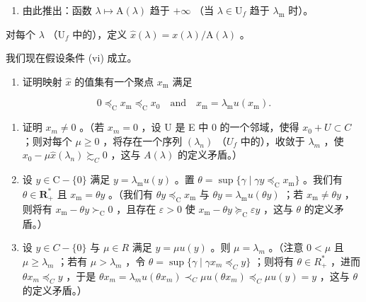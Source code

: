 \begin{enumerate}
\def\labelenumi{\alph{enumi})}
\setcounter{enumi}{1}
\tightlist
\item
  由此推出：函数 \(\lambda \mapsto \mathrm{A}(\lambda)\) 趋于 \(+\infty\) （当 \(\lambda \in \mathrm{U}_f\) 趋于 \(\lambda_{\mathrm{m}}\) 时）。
\end{enumerate}

对每个 \(\lambda\) （\(\mathrm{U}_f\) 中的），定义 \(\hat{x} (\lambda) = x(\lambda) / \mathrm{A}(\lambda)\) 。

我们现在假设条件 (vi) 成立。

\begin{enumerate}
\def\labelenumi{\alph{enumi})}
\setcounter{enumi}{2}
\tightlist
\item
  证明映射 \(\hat{x}\) 的值集有一个聚点 \(x_{\mathrm{m}}\) 满足
\end{enumerate}

\[
0 \preccurlyeq_ {\mathrm{C}} x _ {\mathrm{m}} \preccurlyeq_ {\mathrm{C}} x _ {0} \quad \text {and} \quad x _ {\mathrm{m}} = \lambda_ {\mathrm{m}} u (x _ {\mathrm{m}}).
\]

\begin{enumerate}
\def\labelenumi{\alph{enumi})}
\setcounter{enumi}{3}
\item
  证明 \(x_{m} \neq 0\) 。（若 \(x_{m} = 0\) ，设 U 是 E 中 0 的一个邻域，使得 \(x_{0} + U \subset C\) ；则对每个 \(\mu \geqslant 0\) ，将存在一个序列 \((\lambda_{n})\) （\(U_{f}\) 中的），收敛于 \(\lambda_{m}\) ，使 \(x_{0} - \mu \hat{x}(\lambda_{n}) \succsim_{C} 0\) ，这与 \(A(\lambda)\) 的定义矛盾。）
\item
  设 \(y \in \mathrm{C} - \{0\}\) 满足 \(y = \lambda_{\mathrm{m}} u(y)\) 。置 \(\theta = \sup \{\gamma \mid \gamma y \preccurlyeq_{\mathrm{C}} x_{\mathrm{m}}\}\) 。我们有 \(\theta \in \mathbf{R}_{+}^{*}\) 且 \(x_{\mathrm{m}} = \theta y\) 。（我们有 \(\theta y \preccurlyeq_{\mathrm{C}} x_{\mathrm{m}}\) 与 \(\theta y = \lambda_{\mathrm{m}} u(\theta y)\) ；若 \(x_{\mathrm{m}} \neq \theta y\) ，则将有 \(x_{\mathrm{m}} - \theta y \succ_{\mathrm{C}} 0\) ，且存在 \(\varepsilon > 0\) 使 \(x_{\mathrm{m}} - \theta y \succcurlyeq_{\mathrm{C}} \varepsilon y\) ，这与 \(\theta\) 的定义矛盾。）
\item
  设 \(y \in C - \{0\}\) 与 \(\mu \in R\) 满足 \(y = \mu u(y)\) 。则 \(\mu = \lambda_{m}\) 。（注意 \(0 < \mu\) 且 \(\mu \geqslant \lambda_{m}\) ；若有 \(\mu > \lambda_{m}\) ，令 \(\theta = \sup\{\gamma \mid \gamma x_{m} \preccurlyeq_{C} y\}\) ；则将有 \(\theta \in R_{+}^{*}\) ，进而 \(\theta x_{m} \preccurlyeq_{C} y\) ，于是 \(\theta x_{m} = \lambda_{m} u(\theta x_{m}) \prec_{C} \mu u(\theta x_{m}) \preccurlyeq_{C} \mu u(y) = y\) ，这与 \(\theta\) 的定义矛盾。）
\end{enumerate}

